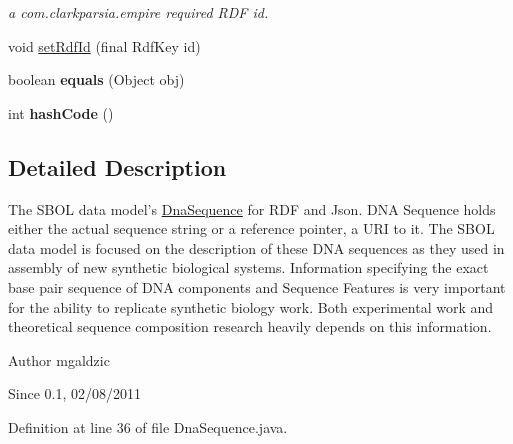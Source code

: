 \begin{DoxyCompactItemize}
\begin{DoxyCompactList}\small\item\em a com.clarkparsia.empire required RDF id. \item\end{DoxyCompactList}\item 
void \hyperlink{classorg_1_1sbolstandard_1_1lib_s_b_o_lj_1_1_dna_sequence_afe8d2a1ced8871ba217ddf364366da99}{setRdfId} (final RdfKey id)
\item 
\hypertarget{classorg_1_1sbolstandard_1_1lib_s_b_o_lj_1_1_dna_sequence_ae3ce8ca5a04e8966a9d2158aeeecfc16}{
boolean {\bfseries equals} (Object obj)}
\label{classorg_1_1sbolstandard_1_1lib_s_b_o_lj_1_1_dna_sequence_ae3ce8ca5a04e8966a9d2158aeeecfc16}

\item 
\hypertarget{classorg_1_1sbolstandard_1_1lib_s_b_o_lj_1_1_dna_sequence_a077e18fe97323c7194e2665ffc766399}{
int {\bfseries hashCode} ()}
\label{classorg_1_1sbolstandard_1_1lib_s_b_o_lj_1_1_dna_sequence_a077e18fe97323c7194e2665ffc766399}

\end{DoxyCompactItemize}


\subsection{Detailed Description}
The SBOL data model's \hyperlink{classorg_1_1sbolstandard_1_1lib_s_b_o_lj_1_1_dna_sequence}{DnaSequence} for RDF and Json. DNA Sequence holds either the actual sequence string or a reference pointer, a URI to it. The SBOL data model is focused on the description of these DNA sequences as they used in assembly of new synthetic biological systems. Information specifying the exact base pair sequence of DNA components and Sequence Features is very important for the ability to replicate synthetic biology work. Both experimental work and theoretical sequence composition research heavily depends on this information.

\begin{DoxyAuthor}{Author}
mgaldzic 
\end{DoxyAuthor}
\begin{DoxySince}{Since}
0.1, 02/08/2011 
\end{DoxySince}


Definition at line 36 of file DnaSequence.java.



